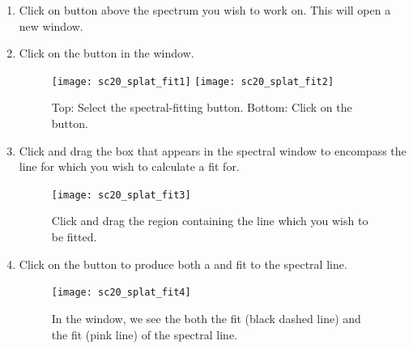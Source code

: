 \documentclass[11pt,oneside,chapters]{starlink}
\begin{document}
\begin{enumerate}[label=(\textbf{\arabic*})]


\item Click on 
button above the spectrum you wish to work on. This will open a
new window.

\item Click on the  button in the
 window.


\begin{figure}[h!]
\begin{center}
\texttt{[image: sc20\_splat\_fit1]}
\texttt{[image: sc20\_splat\_fit2]}
\caption[Select the SPLAT fit button.]{\label{fig:splat_fit1}
  Top: Select the spectral-fitting button. Bottom: Click on
  the  button.}
\end{center}
\end{figure}


\item Click and drag the box that appears in the spectral window
to encompass the line for which you wish to calculate a fit for.


\begin{figure}[h!]
\begin{center}
\texttt{[image: sc20\_splat\_fit3]}
\caption[Spectral fit region defined.]{\label{fig:splat_fit3}
  Click and drag the region containing the line which you wish
  to be fitted.}
\end{center}
\end{figure}


\item Click on the  button to produce both a
 and  fit to the spectral line.

\begin{figure}[h!]
\begin{center}
\texttt{[image: sc20\_splat\_fit4]}
\caption[Getting the spectral line fit.]{\label{fig:splat_fit4}
  In the  window, we see the both
  the  fit (black dashed line) and the
   fit (pink line) of the spectral line.}
\end{center}
\end{figure}



\end{enumerate}
\end{document}
